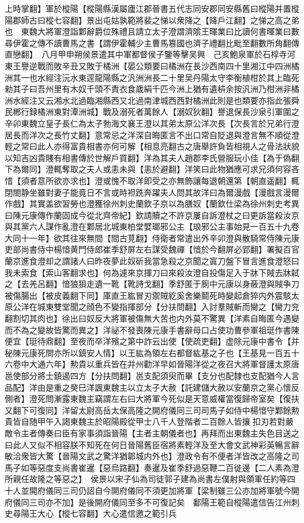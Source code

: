 上時掌翻】軍於樅陽【樅陽縣漢屬廬江郡晉書五代志同安郡同安縣舊曰樅陽并置樅陽郡師古曰樅七容翻】景出屯姑孰範將裴之悌以衆降之【降戶江翻】之悌之高之弟也　東魏大將軍澄詣鄴辭爵位殊禮且請立太子澄謂濟隂王暉業曰比讀何書暉業曰數尋伊霍之傳不讀曹馬之書【謂伊霍輔少主曹馬篡國也濟子禮翻比毗至翻數所角翻傳直戀翻】　八月甲申朔侯景遣其中軍都督侯子鑒等擊吴興　己亥鮑泉軍於石椁寺河東王譽逆戰而敗辛丑又敗于橘洲【晏公類要曰橘洲在長沙西南四十里湘江中四洲橘洲其一也水經注沅水東逕龍陽縣之汎洲洲長二十里吴丹陽太守李衡植柑於其上臨死勑其子曰吾州里有木奴千頭不責衣食歲絹千匹今洲上猶有遺枿余按汎洲乃柑洲非橘洲水經注又云湘水北過臨湘縣西又北過南津城西西對橘洲此則是也類要亦指此張舜民郴行録橘洲東對潭洲城】戰及溺死者萬餘人【溺奴狄翻】譽退保長沙泉引軍圍之辛卯東魏立皇子長仁為太子勃海文襄王澄以其弟太原公洋次長【次長言於兄弟行澄居長而洋次之長竹丈翻】意常忌之洋深自晦匿言不出口常自貶退與澄言無不順從澄輕之常曰此人亦得富貴相書亦何可解【相息亮翻古之唐舉許負皆相視人之骨法狀貌以知吉凶貴賤有相書傳於世解戶買翻】洋為其夫人趙郡李氏營服玩小佳【為于偽翻下為爾同】澄輒奪取之夫人或恚未與【恚於避翻】洋笑曰此物猶應可求兄須何容吝惜【須者意所欲亦求也】澄或愧不取洋即受之亦無飾讓每退朝還第【朝直遥翻】輒閉閤静坐雖對妻子能竟日不言或時袒跣奔躍夫人問其故洋曰為爾漫戲【漫戲言漫爾作戲】其實盖欲習勞也澄獲徐州刺史蘭欽子京以為膳奴【蘭欽仕梁為徐州刺史考異曰陳元康傳作蘭固成今從北齊帝紀】欽請贖之不許京屢自訴澄杖之曰更訴當殺汝京與其黨六人謀作亂澄在鄴居北城東柏堂嬖瑯邪公主【琅邪公主事始見一百五十九卷大同十一年】欲其往來無間【間古莧翻】侍衛者常遣出外辛卯澄與散騎常侍陳元康吏部尚書侍中楊愔黄門侍郎崔季舒屏左右謀受魏禪【愔於今翻屏必郢翻】署擬百官蘭京進食澄却之謂諸人曰昨夜夢此奴斫我當急殺之京聞之寘刀盤下冒言進食澄怒曰我未索食【索山客翻求也】何為遽來京揮刀曰來殺汝澄自投傷足入于牀下賊去牀弑之【去羌呂翻】愔狼狽走遺一靴【靴詩戈翻】季舒匿于厠中元康以身蔽澄與賊争刀被傷腸出【被皮義翻下同】庫直王紘冒刃禦賊紇奚舍樂鬬死時變起倉猝内外震駭太原公洋在城東雙堂聞之顔色不變指揮部分【分扶問翻】入討羣賊斬而臠之【臠力兖翻割切其肉也】徐出曰奴反大將軍被傷無大苦也内外莫不驚異【洋素自晦匿今遇變而不為之變故皆驚而異之】洋祕不發喪陳元康手書辭母口占使功曹參軍祖珽作書陳便宜【珽待鼎翻】至夜而卒洋殯之第中詐云出使【使疏吏翻】虚除元康中書令【并秘陳元康死問亦所以鎮安人情】以王紘為領左右都督紘基之子也【王基見一百五十六卷中大通六年】勲貴以重兵皆在并州勸洋早如晉陽洋從之夜召大將軍督護太原唐邕使部分將士鎮遏四方【分扶問翻】邕支配須臾而畢【支分也配隸也支配猶今人言品配】洋由是重之癸巳洋諷東魏主以立太子大赦【託建儲大赦以安蘭京之黨心懷反側者】澄死問漸露東魏主竊謂左右曰大將軍今死似是天意威權當復歸帝室矣【復扶又翻下可復同】洋留太尉高岳太保高隆之開府儀同三司司馬子如侍中楊愔守鄴餘勲貴皆自随甲午入謁東魏主於昭陽殿從甲士八千人登階者二百餘人皆攘扣刃若對嚴敵令主者傳奏曰臣有家事須詣晉陽【主者主朝儀者也】再拜而出東魏主失色目送之曰此人又似不相容朕不知死在何日晉陽舊臣宿將素輕洋及至大會文武神彩英暢言辭敏洽衆皆大驚【晉陽文武之驚洋猶郼城内外也】澄政令有不便者洋皆改之高隆之司馬子如等惡度支尚書崔暹【惡烏路翻】奏暹及崔季舒過惡鞭二百徙邊【二人素為澄所親任故隆之等惡之】　侯景以宋子仙為司徒郭子建為尚書左僕射與領軍任約等四十人並開府儀同三司仍詔自今開府儀同不須更加將軍【梁制雖三公亦加將軍號今開府儀同三司亦不加】是後開府儀同至多不可復記矣　鄱陽王範自樅陽遣信告江州刺史尋陽王大心【樅七容翻】大心遣信邀之範引兵